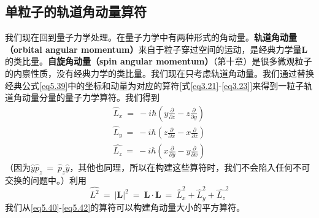 \documentclass[12pt,a4paper,openany]{ctexbook}
\newcommand{\abs}[1]{\left| #1 \right|}
\newcommand{\amv}{\boldsymbol{L}} %
\begin{document}
\subsection{单粒子的轨道角动量算符}
\begin{flushleft}
    \setlength{\parindent}{2em}
我们现在回到量子力学处理。在量子力学中有两种形式的角动量。\textbf{轨道角动量（orbital angular momentum）}来自于粒子穿过空间的运动，是经典力学量$\amv$的类比量。\textbf{自旋角动量（spin angular momentum）}（第十章）是很多微观粒子的内禀性质，没有经典力学的类比量。我们现在只考虑轨道角动量。我们通过替换经典公式\eqref{eq5.39}中的坐标和动量为对应的算符[式\eqref{eq3.21}-\eqref{eq3.23}]来得到一粒子轨道角动量分量的量子力学算符。我们得到
\begin{gather}
    \hat{L}_x\ =\ -i\hbar(y\frac{\partial}{\partial z}-z\frac{\partial}{\partial y}) \label{eq5.40} \\
    \hat{L}_y\ =\ -i\hbar(z\frac{\partial}{\partial x}-x\frac{\partial}{\partial z}) \label{eq5.41} \\
    \hat{L_z}\ =\ -i\hbar(x\frac{\partial}{\partial y}-y\frac{\partial}{\partial x}) \label{eq5.42}
\end{gather}
（因为$\hat{y}\hat{p}_z\ =\ \hat{p}_z\hat{y}$，其他也同理，所以在构建这些算符时，我们不会陷入任何不可交换的问题中。）利用
\begin{equation}
    \hat{L^2}\ =\ \abs{\amv}^2\ =\ \amv\cdot\amv\ =\ \hat{L}_x^2+\hat{L}_y^2+\hat{L_z}^2 \label{eq5.43}
\end{equation}
我们从\eqref{eq5.40}-\eqref{eq5.42}的算符可以构建角动量大小的平方算符。


\end{flushleft}
\end{document}
